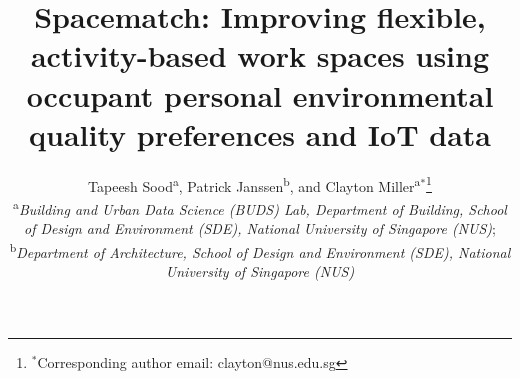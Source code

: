 \documentclass[]{interact}
\theoremstyle{plain}%
\theoremstyle{definition}
\theoremstyle{remark}
\begin{document}

\title{Spacematch: Improving flexible, activity-based work spaces using occupant personal environmental quality preferences and IoT data}

\author{Tapeesh Sood\textsuperscript{a},
Patrick Janssen\textsuperscript{b},
and Clayton Miller\textsuperscript{a}$^{\ast}$\thanks{$^\ast$Corresponding author email: clayton@nus.edu.sg}\\
\vspace{6pt}
\textsuperscript{a}{\em Building and Urban Data Science (BUDS) Lab, Department of Building, School of Design and Environment (SDE), National University of Singapore (NUS)};\\
\textsuperscript{b}{\em Department of Architecture, School of Design and Environment (SDE), National University of Singapore (NUS)}
}

\maketitle
\end{document}
